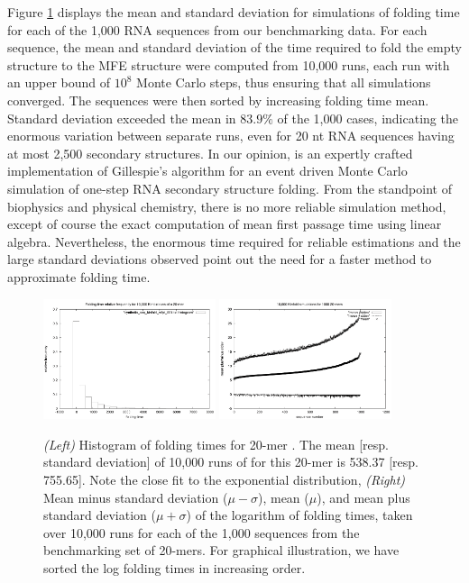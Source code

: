 Figure \ref{fig:hermes:kinfoldMeanStdev} displays the mean
and standard deviation for \kinfold simulations of folding time
for each of the 1,000 RNA sequences from our benchmarking data. For
each sequence, the mean and standard deviation of the time required to
fold the empty structure to the MFE structure were computed from
10,000 \kinfold runs, each run with an upper bound of $10^8$
Monte Carlo steps, thus ensuring that all simulations converged. The
sequences were then sorted by increasing folding time mean. Standard
deviation exceeded the mean in $83.9\%$ of the 1,000 cases, indicating
the enormous variation between separate \kinfold runs, even for
20 nt RNA sequences having at most 2,500 secondary structures. In our
opinion, \kinfold is an expertly crafted implementation of
Gillespie's algorithm for an event driven Monte Carlo simulation of
one-step RNA secondary structure folding. From the standpoint of
biophysics and physical chemistry, there is no more reliable
simulation method, except of course the exact computation of mean
first passage time using linear algebra. Nevertheless, the enormous
time required for reliable \kinfold estimations and the large
standard deviations observed point out the need for a faster method to
approximate folding time.

\begin{figure}[!ht]
\centering
\includegraphics[width=0.45\textwidth]{Figures/Hermes/kinfoldTimeDist.pdf}
\quad
\includegraphics[width=0.45\textwidth]{Figures/Hermes/kinfoldMeanStdev.pdf}
\caption{{\em (Left)} Histogram of \kinfold folding times for 20-mer
. The mean [resp. standard deviation] of 10,000 runs of \kinfold for this 20-mer is 538.37 [resp. 755.65]. Note the close fit to the exponential distribution, {\em (Right)} Mean minus standard deviation ($\mu -\sigma$), mean ($\mu$), and mean plus standard deviation ($\mu + \sigma$) of the logarithm of \kinfold folding times, taken over 10,000 runs for each of the 1,000 sequences from the benchmarking set of 20-mers. For graphical illustration, we have sorted the log folding times in increasing order.}
\label{fig:hermes:kinfoldMeanStdev}
\end{figure}


